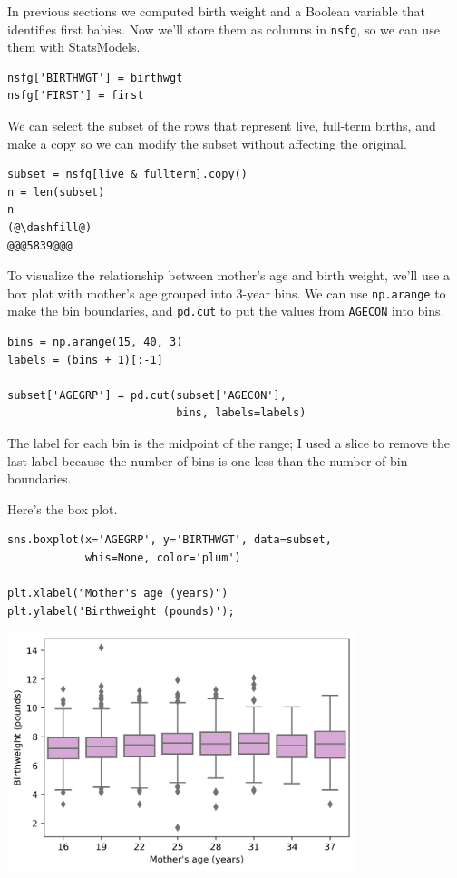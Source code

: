 In previous sections we computed birth weight and a Boolean variable
that identifies first babies. Now we'll store them as columns in
\passthrough{\lstinline!nsfg!}, so we can use them with StatsModels.

\begin{lstlisting}[]
nsfg['BIRTHWGT'] = birthwgt
nsfg['FIRST'] = first
\end{lstlisting}

We can select the subset of the rows that represent live, full-term
births, and make a copy so we can modify the subset without affecting
the original.

\begin{lstlisting}[]
subset = nsfg[live & fullterm].copy()
n = len(subset)
n
(@\dashfill@)
@@@5839@@@
\end{lstlisting}

To visualize the relationship between mother's age and birth weight,
we'll use a box plot with mother's age grouped into 3-year bins. We can
use \passthrough{\lstinline!np.arange!} to make the bin boundaries, and
\passthrough{\lstinline!pd.cut!} to put the values from
\passthrough{\lstinline!AGECON!} into bins.

\begin{lstlisting}[]
bins = np.arange(15, 40, 3)
labels = (bins + 1)[:-1]

subset['AGEGRP'] = pd.cut(subset['AGECON'], 
                          bins, labels=labels)
\end{lstlisting}

The label for each bin is the midpoint of the range; I used a slice to
remove the last label because the number of bins is one less than the
number of bin boundaries.

Here's the box plot.

\begin{lstlisting}[]
sns.boxplot(x='AGEGRP', y='BIRTHWGT', data=subset, 
            whis=None, color='plum')

plt.xlabel("Mother's age (years)")
plt.ylabel('Birthweight (pounds)');
\end{lstlisting}

\begin{center}
\includegraphics[width=4in]{chapters/13_hypothesis_files/13_hypothesis_117_0.png}
\end{center}

